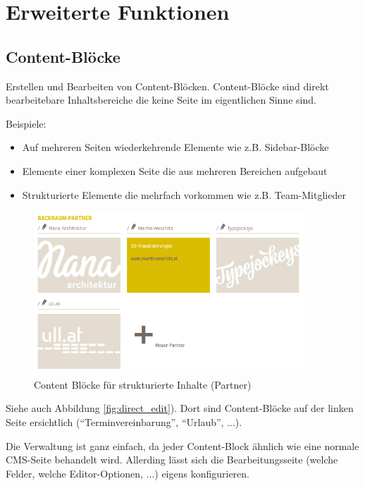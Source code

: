 \documentclass[article, a4paper, oneside, 11pt]{memoir}
\begin{document}
\section{Erweiterte Funktionen}

\subsection{Content-Blöcke}
\label{sec:contentblock}

Erstellen und Bearbeiten von Content-Blöcken. Content-Blöcke sind direkt bearbeitebare Inhaltsbereiche die keine Seite im eigentlichen Sinne sind.

Beispiele:

\begin{itemize}
\item Auf mehreren Seiten wiederkehrende Elemente wie z.B. Sidebar-Blöcke
\item Elemente einer komplexen Seite die aus mehreren Bereichen aufgebaut
\item Strukturierte Elemente die mehrfach vorkommen wie z.B. Team-Mitglieder
\end{itemize}

\begin{figure}[htp]
\centering
\includegraphics[width=0.9\textwidth]{content_block_show}
\caption{Content Blöcke für strukturierte Inhalte (Partner)}
\label{fig:content_block_show}
\end{figure}

Siehe auch Abbildung \vref{fig:direct_edit}). Dort sind Content-Blöcke auf der linken Seite ersichtlich ("`Terminvereinbarung"', "`Urlaub"', ...).

Die Verwaltung ist ganz einfach, da jeder Content-Block ähnlich wie eine normale CMS-Seite behandelt wird.
Allerding lässt sich die Bearbeitungsseite (welche Felder, welche Editor-Optionen, ...) eigens konfigurieren.
\end{document}
